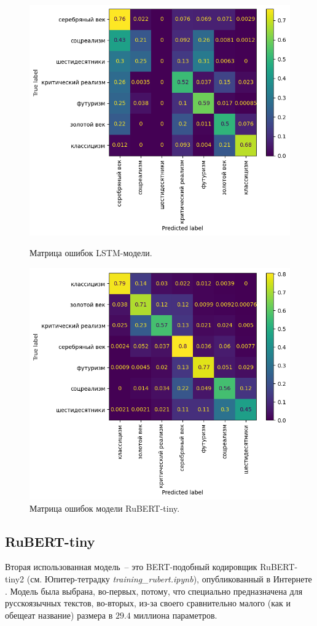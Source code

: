 \documentclass[a4paper,12pt]{article}
\begin{document}
\begin{figure}[tp]
    \centering
    \includegraphics[width=0.75\linewidth]{figures/lstm_confusion_matrix.png}
    \vspace{-0.3cm}
    \caption{Матрица ошибок LSTM-модели.}
    \label{fig:lstm_confusion}
    \vspace{0.5cm}
    \includegraphics[width=0.75\linewidth]{figures/rubert_confusion_matrix.png}
    \vspace{-0.3cm}
    \caption{Матрица ошибок модели RuBERT-tiny.}
    \label{fig:rubert_confusion}
\end{figure}


\subsection{RuBERT-tiny}

Вторая использованная модель~-- это BERT-подобный кодировщик RuBERT-tiny2 (см. Юпитер-тетрадку \textit{training\_rubert.ipynb}), опубликованный в Интернете \cite{rubert_model}. Модель была выбрана, во-первых, потому, что специально предназначена для русскоязычных текстов, во-вторых, из-за своего сравнительно малого (как и обещеат название) размера в $29.4$ миллиона параметров.
\end{document}
